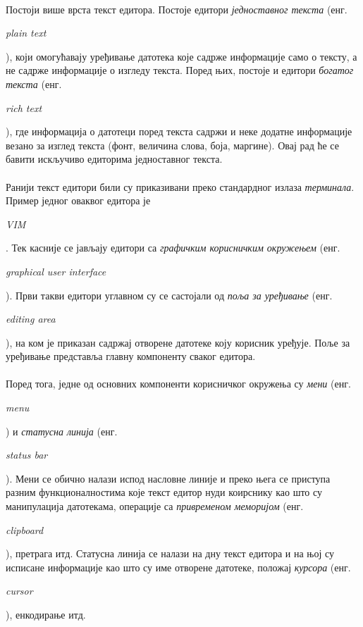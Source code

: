 \documentclass[12pt,oneside]{memoir}
\begin{document}
\paragraph{}
Постоји више врста текст едитора. Постоје едитори \emph{једноставног текста}
(енг. \begin{latinica}\textit{plain text}\end{latinica}), који омогућавају
уређивање датотека које садрже информације
само о тексту, а не садрже информације о изгледу текста. Поред њих, постоје и едитори \emph{богатог текста}
(енг. \begin{latinica}\textit{rich text}\end{latinica}), где информација о датотеци
поред текста садржи и неке додатне информације везано за изглед текста (фонт, величина слова, боја, маргине). Овај рад ће се бавити искључиво
едиторима једноставног текста.

\paragraph{}
Ранији текст едитори били су приказивани преко стандардног излаза \emph{терминала}. 
Пример једног оваквог едитора је \begin{latinica}\textit{VIM}\end{latinica} \cite{VIM}. 
Тек касније се јављају едитори са \emph{графичким корисничким окружењем} 
(енг. \begin{latinica}\textit{graphical user interface}\end{latinica}). Први
такви едитори углавном су се састојали од \emph{поља за уређивање} 
(енг. \begin{latinica}\textit{editing area}\end{latinica}), на ком је
приказан садржај отворене датотеке коју корисник уређује. Поље за уређивање
представља главну компоненту сваког едитора. 

\paragraph{}
Поред тога, једне од основних компоненти
корисничког окружења су \emph{мени} (енг. \begin{latinica}\textit{menu}\end{latinica}) и
\emph{статусна линија} (енг. \begin{latinica}\textit{status bar}\end{latinica}). 
Мени се обично налази испод насловне линије и преко њега се приступа разним
функционалностима које текст едитор нуди коирснику као што су манипулација датотекама,
операције са \emph{привременом меморијом} 
(енг. \begin{latinica}\textit{clipboard}\end{latinica}),
претрага итд. Статусна линија се налази на дну текст едитора и на њој су исписане
информације као што су име отворене датотеке, положај \emph{курсора} (енг. \begin{latinica}\textit{cursor}\end{latinica}), енкодирање итд.
\end{document}
